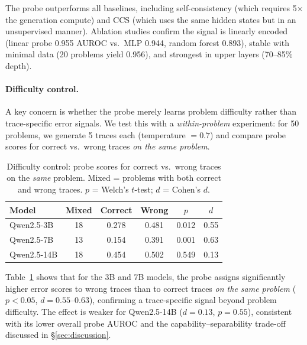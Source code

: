 \documentclass[11pt]{article}
\newcommand{\modelsmall}{Qwen2.5-3B}
\newcommand{\modelmed}{Qwen2.5-7B}
\newcommand{\modellarge}{Qwen2.5-14B}
\begin{document}
The probe outperforms all baselines, including self-consistency (which requires 5$\times$ the generation compute) and CCS (which uses the same hidden states but in an unsupervised manner).
Ablation studies confirm the signal is linearly encoded (linear probe 0.955 AUROC vs.\ MLP 0.944, random forest 0.893), stable with minimal data (20 problems yield 0.956), and strongest in upper layers (70--85\% depth).

\paragraph{Difficulty control.}
A key concern is whether the probe merely learns problem difficulty rather than trace-specific error signals.
We test this with a \textit{within-problem} experiment: for 50 problems, we generate 5 traces each (temperature $= 0.7$) and compare probe scores for correct vs.\ wrong traces \textit{on the same problem}.

\begin{table}[t]
\centering
\small
\begin{tabular}{lccccc}
\toprule
\textbf{Model} & \textbf{Mixed} & \textbf{Correct} & \textbf{Wrong} & $p$ & $d$ \\
\midrule
\modelsmall & 18 & 0.278 & 0.481 & 0.012 & 0.55 \\
\modelmed & 13 & 0.154 & 0.391 & 0.001 & 0.63 \\
\modellarge & 18 & 0.454 & 0.502 & 0.549 & 0.13 \\
\bottomrule
\end{tabular}
\caption{Difficulty control: probe scores for correct vs.\ wrong traces on the \textit{same} problem. Mixed = problems with both correct and wrong traces. $p$ = Welch's $t$-test; $d$ = Cohen's $d$.}
\label{tab:difficulty_control}
\end{table}

Table~\ref{tab:difficulty_control} shows that for the 3B and 7B models, the probe assigns significantly higher error scores to wrong traces than to correct traces \textit{on the same problem} ($p < 0.05$, $d = 0.55$--$0.63$), confirming a trace-specific signal beyond problem difficulty.
The effect is weaker for \modellarge{} ($d = 0.13$, $p = 0.55$), consistent with its lower overall probe AUROC and the capability--separability trade-off discussed in \S\ref{sec:discussion}.
\end{document}
